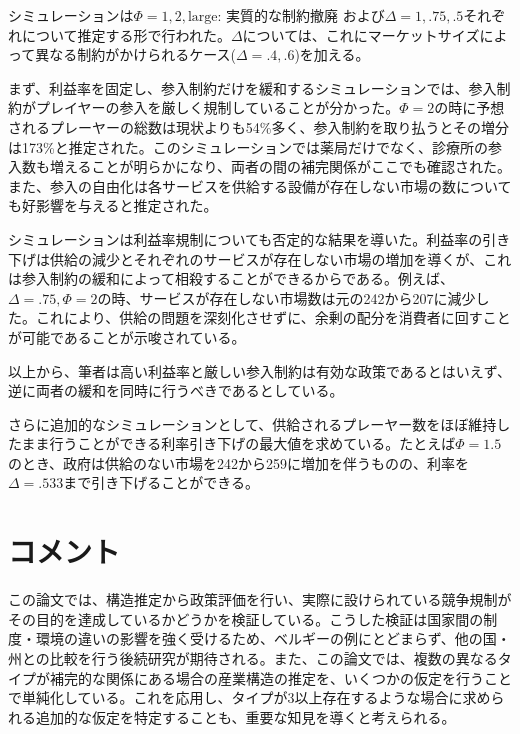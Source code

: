 \documentclass[11pt]{jsarticle}
\begin{document}
シミュレーションは$\Phi=1, 2, \text{large: 実質的な制約撤廃}$ および$\Delta = 1, .75, .5$それぞれについて推定する形で行われた。$\Delta$については、これにマーケットサイズによって異なる制約がかけられるケース($\Delta = .4, .6$)を加える。

まず、利益率を固定し、参入制約だけを緩和するシミュレーションでは、参入制約がプレイヤーの参入を厳しく規制していることが分かった。$\Phi=2$の時に予想されるプレーヤーの総数は現状よりも54\%多く、参入制約を取り払うとその増分は173\%と推定された。このシミュレーションでは薬局だけでなく、診療所の参入数も増えることが明らかになり、両者の間の補完関係がここでも確認された。また、参入の自由化は各サービスを供給する設備が存在しない市場の数についても好影響を与えると推定された。

シミュレーションは利益率規制についても否定的な結果を導いた。利益率の引き下げは供給の減少とそれぞれのサービスが存在しない市場の増加を導くが、これは参入制約の緩和によって相殺することができるからである。例えば、$\Delta=.75, \Phi = 2$の時、サービスが存在しない市場数は元の242から207に減少した。これにより、供給の問題を深刻化させずに、余剰の配分を消費者に回すことが可能であることが示唆されている。

以上から、筆者は高い利益率と厳しい参入制約は有効な政策であるとはいえず、逆に両者の緩和を同時に行うべきであるとしている。

さらに追加的なシミュレーションとして、供給されるプレーヤー数をほぼ維持したまま行うことができる利率引き下げの最大値を求めている。たとえば$\Phi = 1.5$のとき、政府は供給のない市場を242から259に増加を伴うものの、利率を$\Delta=.533$まで引き下げることができる。

\section{コメント}

この論文では、構造推定から政策評価を行い、実際に設けられている競争規制がその目的を達成しているかどうかを検証している。こうした検証は国家間の制度・環境の違いの影響を強く受けるため、ベルギーの例にとどまらず、他の国・州との比較を行う後続研究が期待される。また、この論文では、複数の異なるタイプが補完的な関係にある場合の産業構造の推定を、いくつかの仮定を行うことで単純化している。これを応用し、タイプが3以上存在するような場合に求められる追加的な仮定を特定することも、重要な知見を導くと考えられる。
\end{document}
